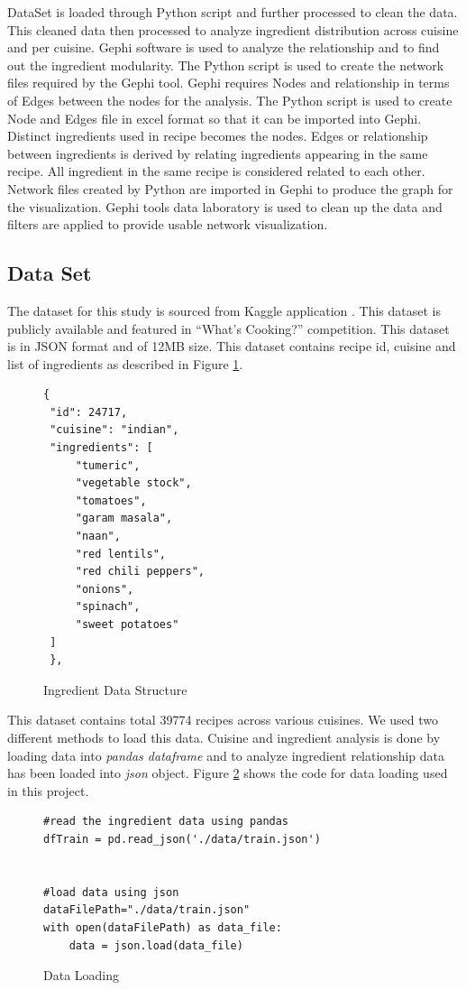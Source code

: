 \documentclass[sigconf]{acmart}
\begin{document}
DataSet is loaded through Python script and further processed to clean the data. This cleaned data then processed to analyze ingredient distribution across cuisine and per cuisine. Gephi software is used to analyze the relationship and to find out the ingredient modularity. The Python script is used to create the network files required by the Gephi tool. Gephi requires Nodes and relationship in terms of Edges between the nodes for the analysis. The Python script is used to create Node and Edges file in excel format so that it can be imported into Gephi. Distinct ingredients used in recipe becomes the nodes. Edges or relationship between ingredients is derived by relating ingredients appearing in the same recipe. All ingredient in the same recipe is considered related to each other.
Network files created by Python are imported in Gephi to produce the graph for the visualization. Gephi tools data laboratory is used to clean up the data and filters are applied to provide usable network visualization. 

\subsection{Data Set}
The dataset for this study is sourced from Kaggle application \cite{www-kaggle}. This dataset is publicly available and featured in ``What's Cooking?'' competition. This dataset is in JSON format and of 12MB size. This dataset contains recipe id, cuisine and list of ingredients as described in Figure \ref{c:data-structure}.
\begin{figure}[htb]
\begin{verbatim}
{
 "id": 24717,
 "cuisine": "indian",
 "ingredients": [
     "tumeric",
     "vegetable stock",
     "tomatoes",
     "garam masala",
     "naan",
     "red lentils",
     "red chili peppers",
     "onions",
     "spinach",
     "sweet potatoes"
 ]
 },
\end{verbatim}
\caption{Ingredient Data Structure}\label{c:data-structure}
\end{figure}
This dataset contains total 39774 recipes across various cuisines. We used two different methods to load this data. Cuisine and ingredient analysis is done by loading data into \emph{pandas dataframe} and to analyze ingredient relationship data has been loaded into \emph{json} object. Figure \ref{c:data-loading} shows the code for data loading used in this project.
\begin{figure}[htb]
\begin{verbatim}
#read the ingredient data using pandas
dfTrain = pd.read_json('./data/train.json')


#load data using json
dataFilePath="./data/train.json"
with open(dataFilePath) as data_file:    
    data = json.load(data_file)
\end{verbatim}
\caption{Data Loading}\label{c:data-loading}
\end{figure}
\end{document}
